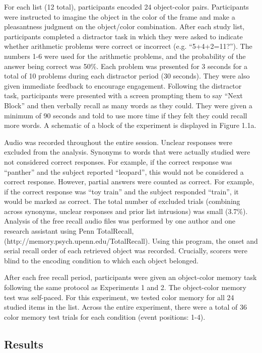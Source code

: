 For each list (12 total), participants encoded 24 object-color pairs.
Participants were instructed to imagine the object in the color of the
frame and make a pleasantness judgment on the object/color combination.
After each study list, participants completed a distractor task in which
they were asked to indicate whether arithmetic problems were correct or
incorrect (e.g. ``5+4+2=11?''). The numbers 1-6 were used for the
arithmetic problems, and the probability of the answer being correct was
50\%. Each problem was presented for 3 seconds for a total of 10
problems during each distractor period (30 seconds). They were also
given immediate feedback to encourage engagement. Following the
distractor task, participants were presented with a screen prompting
them to say ``Next Block'' and then verbally recall as many words as
they could. They were given a minimum of 90 seconds and told to use more
time if they felt they could recall more words. A schematic of a block
of the experiment is displayed in Figure 1.1a.

Audio was recorded throughout the entire session. Unclear responses were
excluded from the analysis. Synonyms to words that were actually studied
were not considered correct responses. For example, if the correct
response was ``panther'' and the subject reported ``leopard'', this
would not be considered a correct response. However, partial answers
were counted as correct. For example, if the correct response was ``toy
train'' and the subject responded ``train'', it would be marked as
correct. The total number of excluded trials (combining across synonyms,
unclear responses and prior list intrusions) was small (3.7\%). Analysis
of the free recall audio files was performed by one author and one
research assistant using Penn TotalRecall,
(http://memory.psych.upenn.edu/TotalRecall). Using this program, the
onset and serial recall order of each retrieved object was recorded.
Crucially, scorers were blind to the encoding condition to which each
object belonged.

After each free recall period, participants were given an object-color
memory task following the same protocol as Experiments 1 and 2. The
object-color memory test was self-paced. For this experiment, we tested
color memory for all 24 studied items in the list. Across the entire
experiment, there were a total of 36 color memory test trials for each
condition (event positions: 1-4).

\subsection{Results}\label{results-2}

